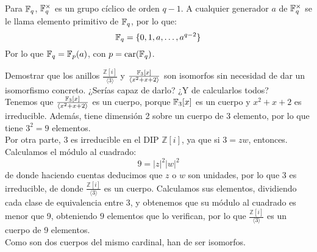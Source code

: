 \begin{observacion}
    Para $\mathbb{F}_q$, $\mathbb{F}_q^\times$ es un grupo cíclico de orden $q-1$.\newline
    A cualquier generador $a$ de $\mathbb{F}_q^\times$ se le llama elemento primitivo de $\mathbb{F}_q$, por lo que:
    \begin{equation*}
        \mathbb{F}_q = \{0, 1, a, \ldots, a^{q-2}\}
    \end{equation*}
    Por lo que $\mathbb{F}_q = \mathbb{F}_p(a)$, con $p = \operatorname{car}(\mathbb{F}_q)$.
\end{observacion}

\begin{ejercicio}
    Demostrar que los anillos $\frac{\mathbb{Z}[i]}{\langle 3 \rangle }$ y $\frac{\mathbb{F}_3[x]}{\langle x^2+x+2 \rangle }$ son isomorfos sin necesidad de dar un isomorfismo concreto. ¿Serías capaz de darlo? ¿Y de calcularlos todos?\\

    \noindent
    Tenemos que $\frac{\mathbb{F}_3[x]}{\langle x^2+x+2 \rangle }$ es un cuerpo, porque $\mathbb{F}_3[x]$ es un cuerpo y $x^2+x+2$ es irreducible. Además, tiene dimensión 2 sobre un cuerpo de 3 elemento, por lo que tiene $3^2 = 9$ elementos.\\

    \noindent
    Por otra parte, $3$ es irreducible en el DIP $\mathbb{Z}[i]$, ya que si $3 = zw$, entonces. Calculamos el módulo al cuadrado:
    \begin{equation*}
        9 = |z|^2 |w|^2 
    \end{equation*}
    de donde haciendo cuentas deducimos que $z$ o $w$ son unidades, por lo que $3$ es irreducible, de donde $\frac{\mathbb{Z}[i]}{\langle 3 \rangle }$ es un cuerpo. Calculamos sus elementos, dividiendo cada clase de equivalencia entre 3, y obtenemos que su módulo al cuadrado es menor que 9, obteniendo $9$ elementos que lo verifican, por lo que $\frac{\mathbb{Z}[i]}{\langle 3 \rangle }$ es un cuerpo de 9 elementos.\\

    \noindent
    Como son dos cuerpos del mismo cardinal, han de ser isomorfos.

\end{ejercicio}

